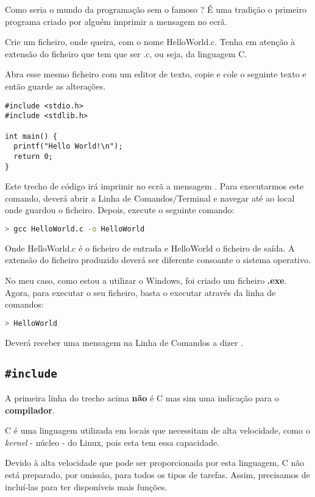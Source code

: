 Como seria o mundo da programação sem o famoso ? É uma tradição o primeiro programa criado por alguém imprimir a mensagem  no ecrã.

Crie um ficheiro, onde queira, com o nome HelloWorld.c. Tenha em atenção à extensão do ficheiro que tem que ser .c, ou seja, da linguagem C.

Abra esse mesmo ficheiro com um editor de texto, copie e cole o seguinte texto e então guarde as alterações.

\begin{lstlisting}
#include <stdio.h>      
#include <stdlib.h>
       
int main() {
  printf("Hello World!\n");      
  return 0;
}
\end{lstlisting}

Este trecho de código irá imprimir no ecrã a mensagem . Para executarmos este comando, deverá abrir a Linha de Comandos/Terminal e navegar até ao local onde guardou o ficheiro. Depois, execute o seguinte comando:

\begin{lstlisting}[language=bash,numbers=none]
> gcc HelloWorld.c -o HelloWorld
\end{lstlisting}

Onde HelloWorld.c é o ficheiro de entrada e HelloWorld o ficheiro de saída. A extensão do ficheiro produzido deverá ser diferente consoante o sistema operativo.

No meu caso, como estou a utilizar o Windows, foi criado um ficheiro \textbf{.exe}. Agora, para executar o seu ficheiro, basta o executar através da linha de comandos:

\begin{lstlisting}[language=bash,numbers=none]
> HelloWorld
\end{lstlisting}

Deverá receber uma mensagem na Linha de Comandos a dizer .

\subsection{\texttt{\#include}}

A primeira linha do trecho acima \textbf{não} é C mas sim uma indicação para o \textbf{compilador}. 

\begin{mdframed}[backgroundcolor=cinzaclaro, linewidth=0pt]
C é uma linguagem utilizada em locais que necessitam de alta velocidade, como o \textit{kernel} - núcleo - do Linux, pois esta tem essa capacidade.

Devido à alta velocidade que pode ser proporcionada por esta linguagem, C não está preparado, por omissão, para todos os tipos de tarefas. Assim, precisamos de incluí-las para ter disponíveis mais funções.
\end{mdframed}

